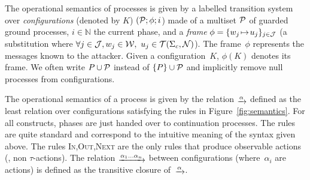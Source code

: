 The operational semantics of processes is given by a labelled transition
system over \emph{configurations} (denoted by $K$) $(\mathcal{P};\phi;i$)
made of a multiset $\mathcal{P}$ of guarded ground processes,
$i\in\mathbb{N}$ the current phase, and
a {\em frame} $\phi = \{w_j \!\mapsto\! u_j\}_{j\in\mathcal{J}}$
(\ie a substitution where $\forall j\in\mathcal{J}, w_j\in\mathcal{W},\ u_j\in\mathcal{T}(\Sigma_c,\mathcal{N})$).
The frame~$\phi$ represents the messages known to the attacker.
Given a configuration~$K$, $\phi(K)$ denotes its frame.
We often write $P \cup \mathcal{P}$  instead of $\{P\} \cup \mathcal{P}$
and implicitly remove null processes from configurations.

\renewcommand{\key}{\mathsf{key}}



The operational semantics of a process 
is given by the relation
$\lrstep{\alpha}$
defined as the least relation over configurations satisfying the rules
in Figure~\ref{fig:semantics}.
%
For all constructs, phases are just handed over to continuation processes.
The rules are quite standard and correspond to the
intuitive meaning of the syntax given above. %
%
The rules \textsc{In,Out,Next} are the only rules that produce observable
actions (\ie, non $\tau$-actions).
%
The relation $\lrstep{\alpha_1 \ldots \alpha_n}$ between
configurations (where~$\alpha_i$ are actions) 
is defined as the transitive closure of~$\lrstep{\alpha}$. 

